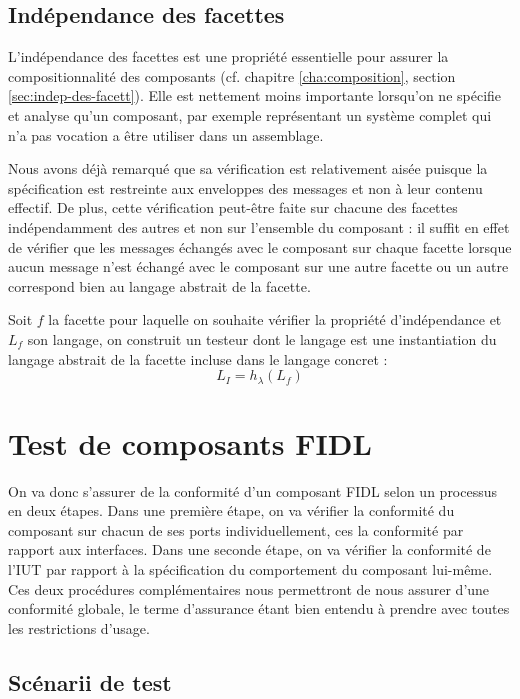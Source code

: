 \subsection{Ind\'ependance des facettes}

L'ind\'ependance des facettes est une propri\'et\'e essentielle
pour assurer la compositionnalit\'e des composants
(cf. chapitre \ref{cha:composition}, section
\ref{sec:indep-des-facett}). Elle est nettement moins importante
lorsqu'on ne sp\'ecifie et analyse qu'un composant, par exemple
repr\'esentant un syst\`eme complet qui n'a pas vocation a \^etre
utiliser dans un assemblage. 

Nous avons d\'ej\`a remarqu\'e que sa v\'erification est
relativement ais\'ee puisque la sp\'ecification  est
restreinte aux enveloppes des messages et non \`a leur contenu
effectif. De plus, cette v\'erification peut-\^etre faite  sur
chacune des facettes ind\'ependamment des autres et non sur
l'ensemble du composant : il suffit en effet de v\'erifier que les
messages \'echang\'es avec le composant sur chaque facette lorsque
aucun message n'est \'echang\'e avec le composant sur une autre
facette ou un autre correspond bien au langage abstrait de la facette.

Soit $f$ la facette pour laquelle on souhaite v\'erifier
la propri\'et\'e d'ind\'ependance et $L_f$ son langage, on
construit un testeur dont le langage est une instantiation du langage
abstrait de la facette incluse dans le langage concret :
$$
L_I = h_\lambda(L_f)
$$  

\section{Test de composants \textsf{FIDL}}

On va donc s'assurer de la conformit\'e d'un composant \textsf{FIDL}
selon un processus en deux \'etapes. Dans une premi\`ere
\'etape, on va v\'erifier la conformit\'e du composant sur chacun
de ses ports individuellement, ces la conformit\'e par rapport aux
interfaces. Dans une seconde \'etape, on va v\'erifier  la
conformit\'e de l'\textsf{IUT} par rapport \`a la sp\'ecification
du comportement du composant lui-m\^eme. Ces deux proc\'edures
compl\'ementaires nous permettront de nous assurer d'une
conformit\'e globale, le terme d'assurance \'etant bien entendu \`a
prendre avec toutes les restrictions d'usage. 

\subsection{Sc\'enarii de test}

